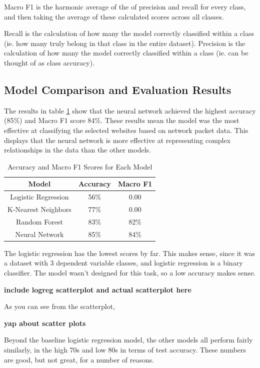 \documentclass[10pt,sigconf,letterpaper,nonacm]{acmart}
\begin{document}
Macro F1 is the harmonic average of the of precision and recall for every class, and then taking the average of these calculated scores across all classes.

Recall is the calculation of how many the model correctly classified within a class (ie. how many truly belong in that class in the entire dataset). 
Precision is the calculation of how many the model correctly classified within a class (ie. can be thought of as class accuracy).


\subsection{Model Comparison and Evaluation Results}
The results in table \ref{tab:results} show that the neural network achieved the highest accuracy (85\%) and Macro F1 score 84\%. These results mean the model was the most effective at classifying the selected websites based on network packet data.
This displays that the neural network is more effective at representing complex relationships in the data than the other models. 

\begin{table}[!h]
  \begin{center}
  \caption{Accuracy and Macro F1 Scores for Each Model}
  \label{tab:results}
  \begin{tabular}{|c|c|c|}
    \hline
    Model & Accuracy & Macro F1 \\
    \hline
    Logistic Regression & 56\% & 0.00 \\
    K-Nearest Neighbors & 77\% & 0.00 \\
    Random Forest & 83\% & 82\% \\
    Neural Network & 85\% & 84\% \\
    \hline
  \end{tabular}
  \end{center}
\end{table}

The logistic regression has the lowest scores by far. This makes sense, since it was a dataset with 3 dependent variable classes, and logistic regression is a binary classifier. 
The model wasn't designed for this task, so a low accuracy makes sense.

{\bf include logreg scatterplot and actual scatterplot here}

As you can see from the scatterplot, 

{\bf yap about scatter plots}

Beyond the baseline logistic regression model, the other models all perform fairly similarly, in the high 70s and low 80s in terms of test accuracy.
These numbers are good, but not great, for a number of reasons.
\end{document}
